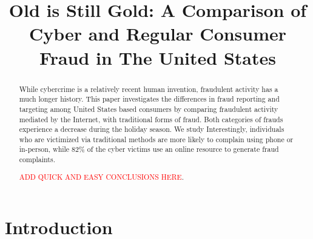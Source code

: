 \documentclass[conference]{IEEEtran}
\newcommand{\ck}[1]{\textcolor{red}{#1}}
\begin{document}
\title{Old is Still Gold: A Comparison of Cyber and Regular Consumer Fraud in The United States}



\maketitle

\begin{abstract}

While cybercrime is a relatively recent human invention, fraudulent activity has a much longer history. This paper investigates the differences in fraud reporting and targeting among United States based consumers by comparing fraudulent activity mediated by the Internet, with traditional forms of fraud. Both categories of frauds experience a decrease during the holiday season. We study Interestingly, individuals who are victimized via traditional methods are more likely to complain using phone or in-person, while 82\% of the cyber victims use an online resource to  generate fraud complaints.   





 \ck{ADD QUICK AND EASY CONCLUSIONS HERE}.

\end{abstract}


\section{Introduction}
\end{document}
